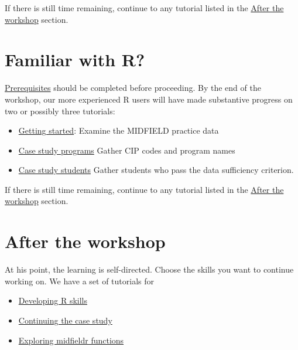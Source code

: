 \documentclass[
]{book}
\providecommand{\tightlist}{%
  \setlength{\itemsep}{0pt}\setlength{\parskip}{0pt}}
\begin{document}
If there is still time remaining, continue to any tutorial listed in the \protect\hyperlink{after-the-workshop}{After the workshop} section.

\hypertarget{familiar-with-r}{%
\section{Familiar with R?}\label{familiar-with-r}}

\protect\hyperlink{prerequisites}{Prerequisites} should be completed before proceeding. By the end of the workshop, our more experienced R users will have made substantive progress on two or possibly three tutorials:

\begin{itemize}
\tightlist
\item
  \href{https://midfieldr.github.io/midfieldr/articles/art-000-getting-started.html}{Getting started}: Examine the MIDFIELD practice data\\
\item
  \href{https://midfieldr.github.io/midfieldr/articles/art-110-case-study-programs.html}{Case study programs} Gather CIP codes and program names
\item
  \href{https://midfieldr.github.io/midfieldr/articles/art-120-case-study-students.html}{Case study students} Gather students who pass the data sufficiency criterion.
\end{itemize}

If there is still time remaining, continue to any tutorial listed in the \protect\hyperlink{after-the-workshop}{After the workshop} section.

\hypertarget{after-the-workshop}{%
\section{After the workshop}\label{after-the-workshop}}

At his point, the learning is self-directed. Choose the skills you want to continue working on. We have a set of tutorials for

\begin{itemize}
\tightlist
\item
  \protect\hyperlink{developing-r-skills}{Developing R skills}
\item
  \protect\hyperlink{continuing-the-case-study}{Continuing the case study}
\item
  \protect\hyperlink{exploring-midfieldr-functions}{Exploring midfieldr functions}
\end{itemize}
\end{document}
